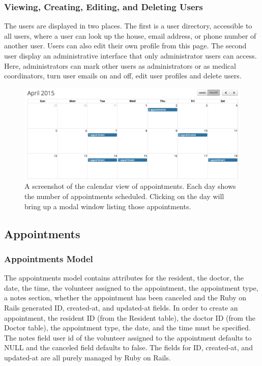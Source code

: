 \documentclass{sig-alternate}
\begin{document}
\subsubsection{Viewing, Creating, Editing, and Deleting Users}
The users are displayed in two places. The first is a user directory, accessible to all users, where a user can look up the house, email address, or phone number of another user. Users can also edit their own profile from this page. The second user display an administrative interface that only administrator users can access. Here, administrators can mark other users as administrators or as medical coordinators, turn user emails on and off, edit user profiles and delete users.

\begin{figure}
\includegraphics[scale=0.4]{Calendar}
\caption{A screenshot of the calendar view of appointments. Each day shows the number of appointments scheduled. Clicking on the day will bring up a modal window listing those appointments.}
\end{figure}

\subsection{Appointments}

\subsubsection{Appointments Model}
The appointments model contains attributes for the resident, the doctor, the date, the time, the volunteer assigned to the appointment, the appointment type, a notes section, whether the appointment has been canceled and the Ruby on Rails generated ID, created-at, and updated-at fields. In order to create an appointment, the resident ID (from the Resident table), the doctor ID (from the Doctor table), the appointment type, the date, and the time must be specified. The notes field user id of the volunteer assigned to the appointment defaults to NULL and the canceled field defaults to false. The fields for ID, created-at, and updated-at are all purely managed by Ruby on Rails. 
\end{document}
